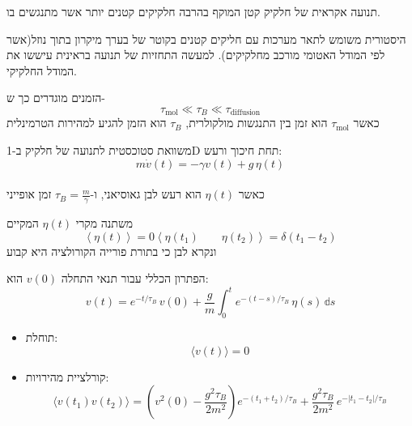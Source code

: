 \documentclass{tstextbook}
\begin{document}
\begin{definition}
תנועה אקראית של חלקיק קטן המוקף בהרבה חלקיקים קטנים יותר אשר מתנגשים בו.

\end{definition}
\begin{remark}
היסטורית משומש לתאר מערכות עם חליקים קטנים בקוטר של בערך מיקרון בתוך נוזל(אשר לפי המודל האטומי מורכב מחלקיקים). למעשה התחזיות של תנועה בראינית עיששו את המודל החלקיקי.

\end{remark}
\begin{definition}
הזמנים מוגדרים כך ש-\\
$$\tau_{\text{mol}} \ll \tau_{B} \ll \tau_{\text{diffusion}}$$
כאשר \(\tau_{\text{mol}}\) הוא זמן בין התנגשות מולקולרית, \(\tau_{B}\) הוא הזמן להגיע למהירות הטרמינלית

\end{definition}
\begin{definition}
משוואת סטוכסטית לתנועה של חלקיק ב-1D תחת חיכוך ורעש:\\
$$m\dot{v}(t) = -\gamma v(t) + g\,\eta(t)$$\\

כאשר \(\eta(t)\) הוא רעש לבן גאוסיאני, ו-\(\tau_{B} = \frac{m}{\gamma}\) זמן אופייני

\end{definition}
\begin{definition}
משתנה מקרי \(\eta(t)\) המקיים\\
$$\left\langle  \eta(t)  \right\rangle = 0\left\langle  \eta(t_{1})\qquad  \eta(t_{2})  \right\rangle = \delta(t_{1} - t_{2})$$
ונקרא לבן כי בתורת פורייה הקורולציה היא קבוע  

\end{definition}
\begin{proposition}
הפתרון הכללי עבור תנאי התחלה \(v(0)\) הוא:\\
$$v(t) = e^{-t / \tau_{B}}\,v(0) + \frac{g}{m} \int_{0}^{t} e^{-(t - s)/\tau_{B}} \,\eta(s)\,\mathbb{d}s$$

\end{proposition}
\begin{proposition}
  \begin{itemize}
    \item תוחלת:\\
$$\langle v(t) \rangle = 0$$
    \item קורלציית מהירויות:\\
$$\langle v(t_{1}) v(t_{2}) \rangle = \left( v^{2}(0) - \frac{g^{2}\tau_{B}}{2m^{2}} \right) e^{-(t_{1}+t_{2})/\tau_{B}} + \frac{g^{2}\tau_{B}}{2m^{2}}\,e^{-|t_{1} - t_{2}|/\tau_{B}}$$
  \end{itemize}
\end{proposition}
\end{document}
